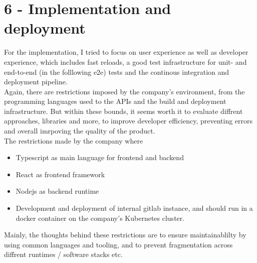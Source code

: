 %
\chapter{6 - Implementation and deployment}
\label{chap:chapters} 


For the implementation, I tried to focus on user experience as well as developer experience, which includes fast reloads,
a good test infrastructure for unit- and end-to-end (in the folllowing e2e) tests and the continous integration and deployment pipeline.
\\
Again, there are restrictions imposed by the company's environment, from the programming languages used to the APIs and the build and deployment infrastructure.
But within these bounds, it seems worth it to evaluate diffrent approaches, libraries and more, to improve developer efficiency,
preventing errors and overall imrpoving the quality of the product.
\\
The restrictions made by the company where
\begin{itemize}
  \item Typescript as main language for frontend and backend
  \item React as frontend framework
  \item Nodejs as backend runtime
  \item Development and deployment of internal gitlab instance, and should run in a docker container on the company's Kubernetes cluster.
\end{itemize}

Mainly, the thoughts behind these restrictions are to ensure maintainablilty by using common languages and tooling, and to prevent fragmentation
across diffrent runtimes / software stacks etc.
\\
